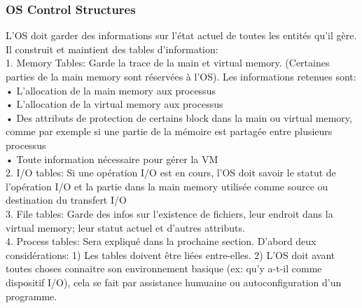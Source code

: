 \subsubsection{OS Control Structures}
L'OS doit garder des informations sur l'état actuel de toutes les entités qu'il gère.
Il construit et maintient des tables d'information: \\
1.
Memory Tables: Garde la trace de la main et virtual memory.
(Certaines parties de la main memory sont réservées à l'OS).
Les informations retenues sont: \\
• L'allocation de la main memory aux processus \\
• L'allocation de la virtual memory aux processus \\
• Des attributs de protection de certains block dans la main ou virtual memory, comme par exemple si une partie de la mémoire est partagée entre plusieurs processus \\
• Toute information nécessaire pour gérer la VM \\
2. I/O tables: Si une opération I/O est en cours, l'OS doit savoir le statut de l'opération I/O et la partie dans la main memory utilisée comme source ou destination du transfert I/O \\
3. File tables: Garde des infos sur l'existence de fichiers, leur endroit dans la virtual memory; leur statut actuel et d'autres attributs. \\
4. Process tables: Sera expliqué dans la prochaine section.
D'abord deux considérations: 1) Les tables doivent être liées entre-elles.
2) L'OS doit avant toutes choses connaitre son environnement basique (ex: qu'y a-t-il comme dispositif I/O), cela se fait par assistance humuaine ou autoconfiguration d'un programme.
